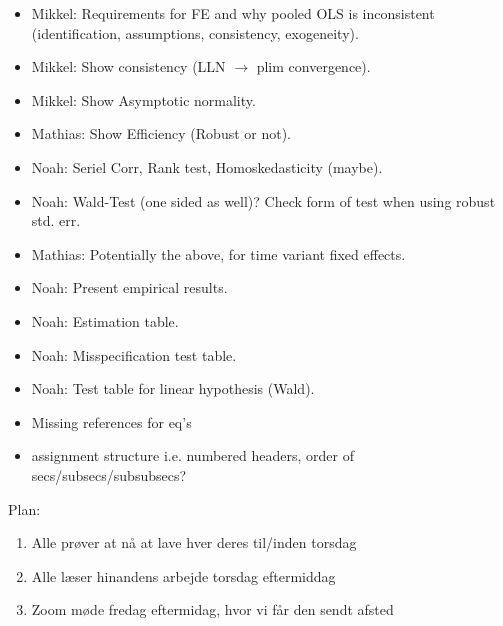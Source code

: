 \begin{itemize}
    \item Mikkel: Requirements for FE and why pooled OLS is inconsistent (identification, assumptions, consistency, exogeneity). 
    \item Mikkel: Show consistency (LLN $\to$ plim convergence). 
    \item Mikkel: Show Asymptotic normality.
    \item Mathias: Show Efficiency (Robust or not).
    \item Noah: Seriel Corr, Rank test, Homoskedasticity (maybe). 
    \item Noah: Wald-Test (one sided as well)? Check form of test when using robust std. err. 
    \item Mathias: Potentially the above, for time variant fixed effects.
    \item Noah: Present empirical results. 
    \item Noah: Estimation table. 
    \item Noah: Misspecification test table.
    \item Noah: Test table for linear hypothesis (Wald). 
    \item Missing references for eq's 
    \item assignment structure i.e. numbered headers, order of secs/subsecs/subsubsecs?
\end{itemize}

Plan:
\begin{enumerate}
    \item Alle prøver at nå at lave hver deres til/inden torsdag
    \item Alle læser hinandens arbejde torsdag eftermiddag
    \item Zoom møde fredag eftermidag, hvor vi får den sendt afsted
\end{enumerate}